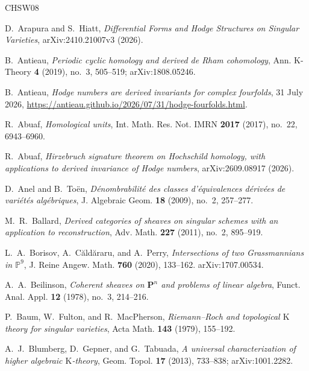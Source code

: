 \documentclass{amsart}
\theoremstyle{plain}
\theoremstyle{definition}
\newcommand{\K}{\mathrm{K}}
\begin{document}
\begin{thebibliography}{CHSW08}

D.~Arapura and S.~Hiatt,
\emph{Differential Forms and Hodge Structures on Singular Varieties}, arXiv:2410.21007v3 (2026).

B.~Antieau,
\emph{Periodic cyclic homology and derived de Rham cohomology}, Ann. K-Theory \textbf{4} (2019), no.~3, 505--519;
arXiv:1808.05246.

B.~Antieau,
\emph{Hodge numbers are derived invariants for complex fourfolds},
31 July 2026,
\url{https://antieau.github.io/2026/07/31/hodge-fourfolds.html}.


R.~Abuaf, \emph{Homological units}, Int. Math. Res. Not. IMRN \textbf{2017} (2017), no.~22,
6943--6960.

R.~Abuaf,
\emph{Hirzebruch signature theorem on Hochschild homology, with applications to derived invariance of Hodge numbers}, arXiv:2609.08917 (2026).

D.~Anel and B.~To\"en,
\emph{D\'enombrabilit\'e des classes d'\'equivalences d\'eriv\'ees de vari\'et\'es alg\'ebriques}, J. Algebraic Geom. \textbf{18} (2009), no.~2, 257--277.

M.~R.~Ballard,
\emph{Derived categories of sheaves on singular schemes with an application to reconstruction}, Adv. Math. \textbf{227} (2011), no.~2, 895--919.





L.~A.~Borisov, A.~C{\u a}ld{\u a}raru, and A.~Perry,
\emph{Intersections of two Grassmannians in $\mathbb P^9$}, J. Reine Angew. Math. \textbf{760} (2020), 133--162.
arXiv:1707.00534.



A.~A.~Beilinson,
\emph{Coherent sheaves on $\mathbf P^n$ and problems of linear algebra}, Funct. Anal. Appl. \textbf{12} (1978), no.~3, 214--216.

P.~Baum, W.~Fulton, and R.~MacPherson,
\emph{Riemann--Roch and topological $\K$ theory for singular varieties}, Acta Math. \textbf{143} (1979), 155--192.

A.~J.~Blumberg, D.~Gepner, and G.~Tabuada,
\emph{A universal characterization of higher algebraic $\K$-theory}, Geom. Topol. \textbf{17} (2013), 733--838; arXiv:1001.2282.


\end{thebibliography}
\end{document}
